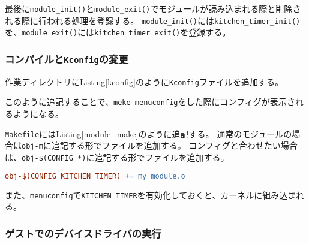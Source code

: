 \documentclass[main]{subfiles}
\begin{document}
最後に\texttt{module\_init()}と\texttt{module\_exit()}でモジュールが読み込まれる際と削除される際に行われる処理を登録する。
\texttt{module\_init()}には\texttt{kitchen\_timer\_init()}を、\texttt{module\_exit()}には\texttt{kitchen\_timer\_exit()}を登録する。

\subsubsection{コンパイルと\texttt{Kconfig}の変更}

作業ディレクトリにListing\ref{kconfig}のように\texttt{Kconfig}ファイルを追加する。



このように追記することで、\texttt{meke menuconfig}をした際にコンフィグが表示されるようになる。

\texttt{Makefile}にはListing\ref{module_make}のように追記する。
通常のモジュールの場合は\texttt{obj-m}に追記する形でファイルを追加する。
コンフィグと合わせたい場合は、\texttt{obj-\$(CONFIG\_*)}に追記する形でファイルを追加する。

\begin{lstlisting}[label=module_make,caption=モジュールの\texttt{make},language=make]
obj-$(CONFIG_KITCHEN_TIMER) += my_module.o
\end{lstlisting}

また、\texttt{menuconfig}で\texttt{KITCHEN\_TIMER}を有効化しておくと、カーネルに組み込まれる。

\subsubsection{ゲストでのデバイスドライバの実行}
\end{document}
